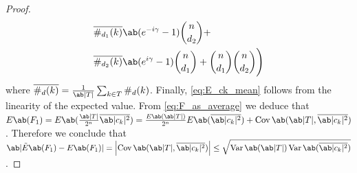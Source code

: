 \begin{proof}
\begin{align*}
                                                                      &\overline{\#_{d_1} (k)} \ab(e^{-i \pangle} - 1) \binom{n}{d_2} + \\
                                                                     &\overline{\#_{d_2} (k)} \ab(e^{i \pangle} - 1) \binom{n}{d_1} +
                                                                      \binom{n}{d_1} \binom{n}{d_2}\Bigg) 
    \end{align*}
    where $\overline{\#_d (k)} = \frac{1}{\ab|T|} \sum_{k \in T} \#_d (k)$. Finally, \cref{eq:E_ck_mean} follows from the linearity of the expected value. From \cref{eq:F_as_average} we deduce that $E\ab(F_1) = E \ab(\frac{\ab|T|}{2^n} \overline{\ab|c_k|^2}) = \frac{E\ab(\ab|T|)}{2^n} E\ab(\overline{\ab|c_k|^2}) + \Cov\ab(\ab|T|, \overline{\ab|c_k|^2})$. Therefore we conclude that $\ab|\tilde{E}\ab(F_1) - E\ab(F_1)| = \left|\Cov\ab(\ab|T|, \overline{\ab|c_k|^2})\right| \leq \sqrt{\Var\ab(\ab|T|) \Var\ab(\overline{\ab|c_k|^2})}$.
\end{proof}

